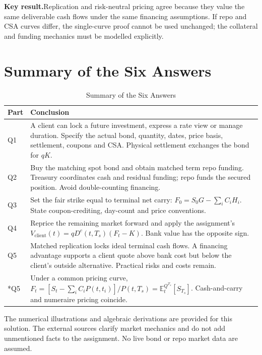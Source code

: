 \documentclass[11pt]{article}
\newcommand{\keynote}[1]{\par\medskip\noindent\textbf{\sffamily\color{NYUviolet}Key result.}\enspace #1\par\medskip}
\newcommand{\E}{\mathbb{E}}
\numberwithin{equation}{section}
\begin{document}
\keynote{Replication and risk-neutral pricing agree because they value the same deliverable cash flows under the same financing assumptions. If repo and CSA curves differ, the single-curve proof cannot be used unchanged; the collateral and funding mechanics must be modelled explicitly.}

\clearpage
\section*{Summary of the Six Answers}

\begin{table}[H]
\centering
\caption{Summary of the Six Answers}
\label{tab:solution-7}
\small
\begin{tabularx}{\textwidth}{@{}L{1.2cm}Y@{}}
\toprule{}\textbf{Part} & \textbf{Conclusion}\\\midrule
Q1 & A client can lock a future investment, express a rate view or manage duration. Specify the actual bond, quantity, dates, price basis, settlement, coupons and CSA. Physical settlement exchanges the bond for $qK$.\\
Q2 & Buy the matching spot bond and obtain matched term repo funding. Treasury coordinates cash and residual funding; repo funds the secured position. Avoid double-counting financing.\\
Q3 & Set the fair strike equal to terminal net carry: $F_0=S_0G-\sum_iC_iH_i$. State coupon-crediting, day-count and price conventions.\\
Q4 & Reprice the remaining market forward and apply the assignment's $V_{\mathrm{client}}(t)=qD^c(t,T_s)(F_t-K)$. Bank value has the opposite sign.\\
Q5 & Matched replication locks ideal terminal cash flows. A financing advantage supports a client quote above bank cost but below the client's outside alternative. Practical risks and costs remain.\\
*Q5 & Under a common pricing curve, $F_t=[S_t-\sum_iC_iP(t,t_i)]/P(t,T_s)=\E_t^{Q^{T_s}}[S_{T_s}]$. Cash-and-carry and numeraire pricing coincide.\\\bottomrule
\end{tabularx}
\end{table}


The numerical illustrations and algebraic derivations are provided for this solution. The external sources clarify market mechanics and do not add unmentioned facts to the assignment. No live bond or repo market data are assumed.
\end{document}
